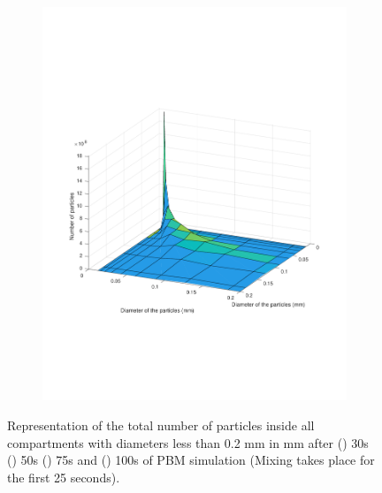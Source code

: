 \documentclass[preprint,11pt,authoryear]{elsarticle}
\begin{document}
\begin{figure}
\begin{subfigure}{.5\textwidth}
\includegraphics[scale=0.45]{rslts-PBM_100s_psd.pdf}
\caption{}
\label{fig:100s}
\end{subfigure}
\caption{ Representation of the total number of particles inside all compartments with diameters less than 0.2 mm 
in mm after () 30s () 50s () 75s and
 () 100s of PBM simulation (Mixing takes place for the first 25 seconds).}
\label{fig:rslts_PBM_d50_plots}
\end{figure}   
\end{document}
